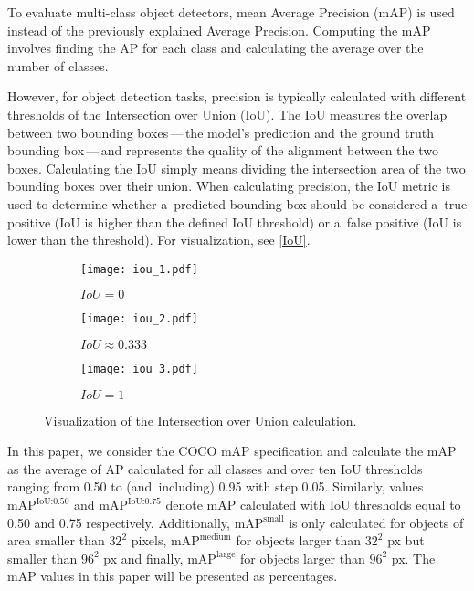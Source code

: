 To evaluate multi-class object detectors, mean Average Precision (mAP) is used
instead of the previously explained Average Precision. Computing the mAP
involves finding the AP for each class and calculating the average over the
number of classes.

However, for object detection tasks, precision is typically calculated with
different thresholds of the Intersection over Union (IoU). The IoU
measures the overlap between two bounding boxes\,---\,the model's
prediction and the ground truth bounding box\,---\,and represents the quality of the
alignment between the two boxes. Calculating the IoU simply means dividing the
intersection area of the two bounding boxes over their union. When calculating
precision, the IoU metric is used to determine whether a~predicted bounding box
should be considered a~true positive (IoU is higher than the defined IoU
threshold) or a~false positive (IoU is lower than the threshold). For
visualization, see \autoref{IoU}.

\begin{figure}[t]
    \centering
    \begin{subfigure}[b]{0.3125\textwidth}
        \texttt{[image: iou\_1.pdf]}
        \caption{$IoU = 0$}
    \end{subfigure}
    \hfill
    \begin{subfigure}[b]{0.2272727\textwidth}
        \texttt{[image: iou\_2.pdf]}
        \caption{$IoU \approx 0.333$}
    \end{subfigure}
    \hfill
    \begin{subfigure}[b]{0.15151515\textwidth}
        \texttt{[image: iou\_3.pdf]}
        \caption{$IoU = 1$}
    \end{subfigure}

    \caption{Visualization of the Intersection over Union calculation.}
    \label{IoU}
\end{figure}

In this paper, we consider the COCO mAP specification and calculate the mAP as
the average of AP calculated for all classes and over ten IoU thresholds ranging
from \num{0.50} to (and~including) \num{0.95} with step \num{0.05}. Similarly,
values $\text{mAP}^{\text{IoU:0.50}}$ and $\text{mAP}^{\text{IoU:0.75}}$ denote
mAP calculated with IoU thresholds equal to \num{0.50} and \num{0.75}
respectively. Additionally, $\text{mAP}^{\text{small}}$ is only calculated for
objects of area smaller than $32^2$ pixels, $\text{mAP}^{\text{medium}}$ for
objects larger than $32^2$ px but smaller than $96^2$ px and finally,
$\text{mAP}^{\text{large}}$ for objects larger than $96^2$ px. The mAP values
in this paper will be presented as percentages.


